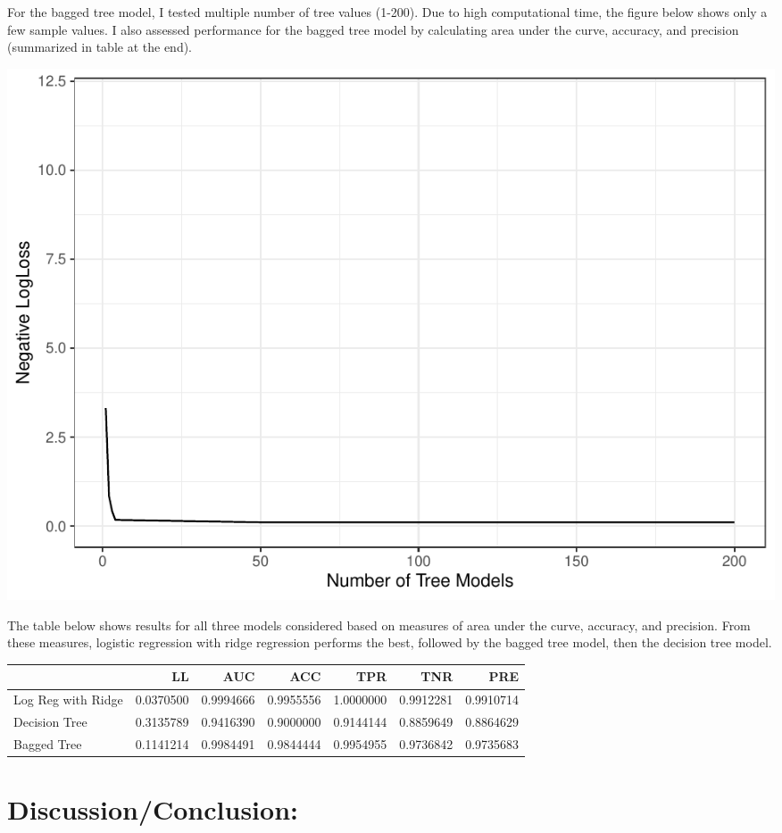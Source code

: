 \documentclass[
  english,
  man]{apa6}
\begin{document}
For the bagged tree model, I tested multiple number of tree values (1-200). Due to high computational time, the figure below shows only a few sample values. I also assessed performance for the bagged tree model by calculating area under the curve, accuracy, and precision (summarized in table at the end).

\includegraphics{Babu_Final_files/figure-latex/best bagged-1.pdf}

The table below shows results for all three models considered based on measures of area under the curve, accuracy, and precision. From these measures, logistic regression with ridge regression performs the best, followed by the bagged tree model, then the decision tree model.

\begin{tabular}{l|r|r|r|r|r|r}
\hline
  & LL & AUC & ACC & TPR & TNR & PRE\\
\hline
Log Reg with Ridge & 0.0370500 & 0.9994666 & 0.9955556 & 1.0000000 & 0.9912281 & 0.9910714\\
\hline
Decision Tree & 0.3135789 & 0.9416390 & 0.9000000 & 0.9144144 & 0.8859649 & 0.8864629\\
\hline
Bagged Tree & 0.1141214 & 0.9984491 & 0.9844444 & 0.9954955 & 0.9736842 & 0.9735683\\
\hline
\end{tabular}

\hypertarget{discussionconclusion}{%
\section{Discussion/Conclusion:}\label{discussionconclusion}}
\end{document}
